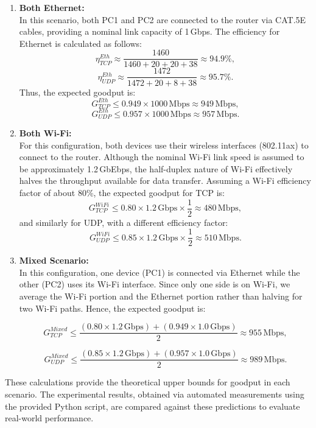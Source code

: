         \begin{enumerate}

            \item \textbf{Both Ethernet:} \\
            In this scenario, both PC1 and PC2 are connected to the router via CAT.5E cables, providing a nominal link capacity of 1\,Gbps. 
            The efficiency for Ethernet is calculated as follows:
            \[
            \eta_{TCP}^{Eth} \approx \frac{1460}{1460 + 20 + 20 + 38} \approx 94.9\%,
            \]
            \[
            \eta_{UDP}^{Eth} \approx \frac{1472}{1472 + 20 + 8 + 38} \approx 95.7\%.
            \]
            Thus, the expected goodput is:
            \[
            G_{TCP}^{Eth} \leq 0.949 \times 1000\,\text{Mbps} \approx 949\,\text{Mbps},
            \]
            \[
            G_{UDP}^{Eth} \leq 0.957 \times 1000\,\text{Mbps} \approx 957\,\text{Mbps}.
            \]

            \vspace{0.2cm} %

            \item \textbf{Both Wi-Fi:} \\
            For this configuration, both devices use their wireless interfaces (802.11ax) to connect to the router. 
            Although the nominal Wi-Fi link speed is assumed to be approximately 1.2\,GbEbps, the half-duplex nature of Wi-Fi effectively halves the throughput available for data transfer. 
            Assuming a Wi-Fi efficiency factor of about 80\%, the expected goodput for TCP is:
            \[
            G_{TCP}^{WiFi} \leq 0.80 \times 1.2\,\text{Gbps} \times \frac{1}{2} \approx 480\,\text{Mbps},
            \]
            and similarly for UDP, with a different efficiency factor:
            \[
            G_{UDP}^{WiFi} \leq 0.85 \times 1.2\,\text{Gbps} \times \frac{1}{2} \approx 510\,\text{Mbps}.
            \]


            \item \textbf{Mixed Scenario:} \\
            In this configuration, one device (PC1) is connected via Ethernet while the other (PC2) uses its Wi-Fi interface. 
            Since only one side is on Wi-Fi, we average the Wi-Fi portion and the Ethernet portion rather than halving for two Wi-Fi paths. 
            Hence, the expected goodput is:

            \[
            G_{TCP}^{Mixed} \leq \frac{(0.80 \times 1.2\,\text{Gbps}) + (0.949 \times 1.0\,\text{Gbps})}{2} \approx 955\,\text{Mbps},
            \]

            \[
            G_{UDP}^{Mixed} \leq \frac{(0.85 \times 1.2\,\text{Gbps}) + (0.957 \times 1.0\,\text{Gbps})}{2} \approx 989\,\text{Mbps}.
            \]

        \end{enumerate}

        These calculations provide the theoretical upper bounds for goodput in each scenario. 
        The experimental results, obtained via automated measurements using the provided Python script, are compared against these predictions to evaluate real-world performance.

        \medskip